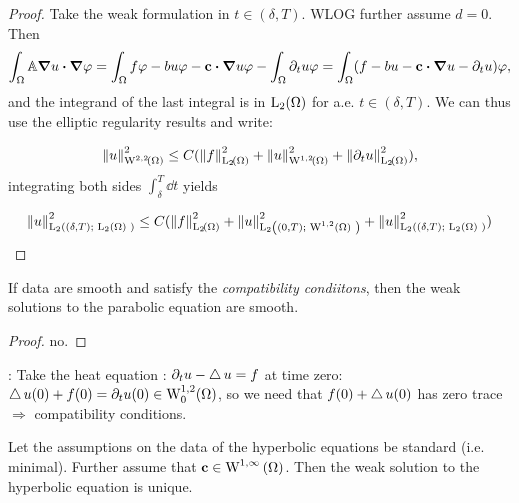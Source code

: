 \documentclass{article}
\begin{document}
\begin{proof}
    Take the weak formulation in $t \in (\delta,T)$. WLOG further assume $d=0$. Then
    \begin{equation*}
	    \int_{\Omega} \tensorq{A} \grad{u} \vdot \grad{\varphi}  = \int_{\Omega}f \varphi - bu \varphi - \vb{c}\vdot \grad{u} \varphi - \int_{\Omega} \partial_t u \varphi = \int_{\Omega}(f-bu-\vb{c}\vdot \grad{u} - \partial_t u) \varphi,
    \end{equation*}
and the integrand of the last integral is in $\LpSet[2]{\Omega}$ for a.e. $t \in (\delta,T)$. We can thus use the elliptic regularity results and write:

\begin{equation*}
    \norm{u}_{\WkpSet[2][2]{\Omega}}^{2} \leq C(\norm{f}_{\LpSet[2]{\Omega}}^{2} + \norm{u}_{\WkpSet[1][2]{\Omega}}^{2} + \norm{\partial_t u}_{\LpSet[2]{\Omega}}^{2}),
\end{equation*}
integrating both sides $\int_{\delta}^T \dd{t}$ yields

\begin{equation*}
    \NormLpIntX{u}{2}{\delta}{T}{\LpSet[2]{\Omega}}^{2} \leq C(\norm{f}_{\LpSet[2]{\Omega}}^{2} + \NormLpIntX{u}{2}{0}{T}{\WkpSet[1][2]{\Omega}} ^{2} + \NormLpIntX{u}{2}{\delta}{T}{\LpSet[2]{\Omega}}^{2})
\end{equation*}
\end{proof}

\begin{theorem}
    If data are smooth and satisfy the \textit{compatibility condiitons}, then the weak solutions to the parabolic equation are smooth.
\end{theorem}
\begin{proof}
    no.
\end{proof}

\begin{remark}:
	Take the heat equation :
	$\partial_t u -  \operatorname{\bigtriangleup} u  = f$ at time zero: $\laplace u (0) + f(0) = \partial_t u(0) \in \WkpzeroSet[1][2]{\Omega}$, so we need that $f(0) + \operatorname{\bigtriangleup} u (0)$ has zero trace $\Rightarrow$ compatibility conditions. 
\end{remark}

\begin{theorem}
    Let the assumptions on the data of the hyperbolic equations be standard (i.e. minimal). Further assume that $\vb{c} \in \text{W}^{1, \infty}\!\,\left(\Omega \right)$. Then the weak solution to the hyperbolic equation is unique.
\end{theorem}
\end{document}

